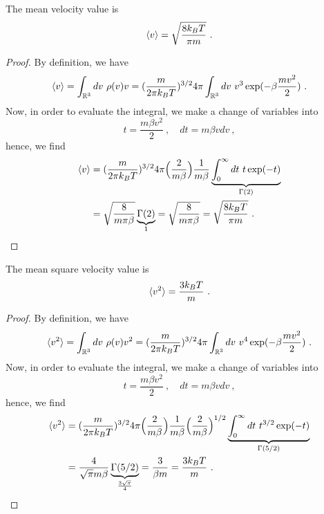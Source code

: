     The mean velocity value is 
    \begin{equation*}
        \langle v\rangle = \sqrt{\frac{8 k_B T}{\pi m}} ~.
    \end{equation*}
    \begin{proof}
        By definition, we have
        \begin{equation*}
            \langle v\rangle = \int_{\mathbb R^3} dv ~ \rho(v) v = (\frac{m}{2\pi k_B T})^{3/2} 4 \pi \int_{\mathbb R^3} dv ~ v^3 \exp(- \beta \frac{m v^2}{2}) ~.
        \end{equation*}
        Now, in order to evaluate the integral, we make a change of variables into
        \begin{equation*}
            t = \frac{m \beta v^2}{2} ~, \quad dt = m \beta v dv ~,
        \end{equation*}
        hence, we find
        \begin{equation*}
        \begin{aligned}
            \langle v\rangle & =  (\frac{m}{2\pi k_B T})^{3/2} 4 \pi \Big (\frac{2}{m \beta} \Big) \frac{1}{m \beta} \underbrace{\int_0^\infty dt ~ t \exp(- t)}_{\Gamma (2)} \\ & = \sqrt{\frac{8}{m \pi \beta}} \underbrace{\Gamma (2)}_1 = \sqrt{\frac{8}{m \pi \beta}} = \sqrt{\frac{8 k_B T}{\pi m}} ~.
        \end{aligned}
        \end{equation*}
    \end{proof}

    The mean square velocity value is 
    \begin{equation*}
        \langle v^2\rangle = \frac{3 k_B T}{m} ~.
    \end{equation*}
    \begin{proof}
        By definition, we have
        \begin{equation*}
            \langle v^2\rangle = \int_{\mathbb R^3} dv ~ \rho(v) v^2 = (\frac{m}{2\pi k_B T})^{3/2} 4 \pi \int_{\mathbb R^3} dv ~ v^4 \exp(- \beta \frac{m v^2}{2}) ~.
        \end{equation*}
        Now, in order to evaluate the integral, we make a change of variables into
        \begin{equation*}
            t = \frac{m \beta v^2}{2} ~, \quad dt = m \beta v dv ~,
        \end{equation*}
        hence, we find
        \begin{equation*}
        \begin{aligned}
            \langle v^2\rangle & =  (\frac{m}{2\pi k_B T})^{3/2} 4 \pi \Big (\frac{2}{m \beta} \Big) \frac{1}{m \beta} \Big ( \frac{2}{m \beta} \Big)^{1/2} \underbrace{\int_0^\infty dt ~ t^{3/2} \exp(- t)}_{\Gamma (5/2)} \\ & = \frac{4}{\sqrt{\pi} m \beta} \underbrace{\Gamma (5/2)}_{\frac{3 \sqrt{\pi}}{4}} = \frac{3}{\beta m} = \frac{3 k_B T}{m} ~.
        \end{aligned}
        \end{equation*}
    \end{proof}

